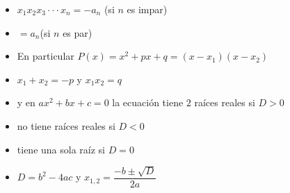 \begin{itemize}
    \item[] $x_1x_2x_3 \cdot\cdot\cdot x_n = -a_n$ (si $n$ es impar) \vspace{-0.3cm}
    \item[] \hspace{2.35cm}$= a_n$\hspace{0.45cm}(si $n$ es par)
    \item[] En particular $P(x) = x^2+px +q = (x - x_1)(x - x_2)$ \vspace{-0.3cm}
    \item[] \hspace{2.5cm} $x_1+x_2 = -p$ y $x_1x_2=q$ 
    \item[] y en $ax^2 + bx +c =0$ la ecuación tiene $2$ raíces reales si $D>0$ \vspace{-0.3cm}
    \item[] \hspace{5.65cm} no tiene raíces reales si $D<0$\vspace{-0.3cm}
    \item[] \hspace{5.65cm} tiene una sola raíz si $D=0$\vspace{-0.3cm}
    \item[] $D=b^2-4ac$ y $x_{1,2}=\dfrac{-b \pm \sqrt{D}}{2a}$
\end{itemize}

\vspace{0.5cm}

